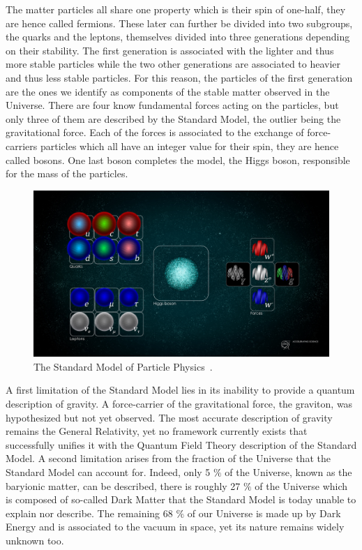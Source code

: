 The matter particles all share one property which is their spin of one-half, they are hence called fermions. These later can further be divided into two subgroups, the quarks and the leptons, themselves divided into three generations depending on their stability. The first generation is associated with the lighter and thus more stable particles while the two other generations are associated to heavier and thus less stable particles. For this reason, the particles of the first generation are the ones we identify as components of the stable matter observed in the Universe.
There are four know fundamental forces acting on the particles, but only three of them are described by the Standard Model, the outlier being the gravitational force. Each of the forces is associated to the exchange of force-carriers particles which all have an integer value for their spin, they are hence called bosons. One last boson completes the model, the Higgs boson, responsible for the mass of the particles. \\ \clearpage

\begin{figure}[h]
	\centering
 	\includegraphics[width=0.9\linewidth]{files/StandardModel.pdf}
 	\caption{The Standard Model of Particle Physics\ \cite{cern_SM}.}\label{StandardModel}
\end{figure}

A first limitation of the Standard Model lies in its inability to provide a quantum description of gravity. A force-carrier of the gravitational force, the graviton, was hypothesized but not yet observed. The most accurate description of gravity remains the General Relativity, yet no framework currently exists that successfully unifies it with the Quantum Field Theory description of the Standard Model.
A second limitation arises from the fraction of the Universe that the Standard Model can account for. Indeed, only 5 $\%$ of the Universe, known as the baryionic matter, can be described, there is roughly 27 $\%$ of the Universe which is composed of so-called Dark Matter that the Standard Model is today unable to explain nor describe. The remaining 68 $\%$ of our Universe is made up by Dark Energy and is associated to the vacuum in space, yet its nature remains widely unknown too.\\

